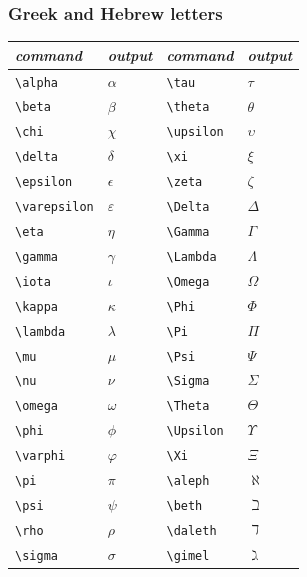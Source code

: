 \documentclass{article} %
\begin{document}
    \subsubsection{Greek and Hebrew letters}
        \begin{center}
        \begin{tabular}{l|l|l|l}
        \emph{command} & \emph{output}&\emph{command} & \emph{output}\\ \hline
        \verb!\alpha! & $\alpha$&\verb!\tau! & $\tau$\\
        \verb!\beta! & $\beta$&\verb!\theta! & $\theta$\\
        \verb!\chi! & $\chi$&\verb!\upsilon! & $\upsilon$\\
        \verb!\delta! & $\delta$&\verb!\xi! & $\xi$\\
        \verb!\epsilon! & $\epsilon$&\verb!\zeta! & $\zeta$\\
        \verb!\varepsilon! & $\varepsilon$&\verb!\Delta! & $\Delta$\\
        \verb!\eta! & $\eta$&\verb!\Gamma! & $\Gamma$\\
        \verb!\gamma! & $\gamma$&\verb!\Lambda! & $\Lambda$\\
        \verb!\iota! & $\iota$&\verb!\Omega! & $\Omega$\\
        \verb!\kappa! & $\kappa$&\verb!\Phi! & $\Phi$\\
        \verb!\lambda! & $\lambda$&\verb!\Pi! & $\Pi$\\
        \verb!\mu! & $\mu$&\verb!\Psi! & $\Psi$\\
        \verb!\nu! & $\nu$&\verb!\Sigma! & $\Sigma$\\
        \verb!\omega! & $\omega$&\verb!\Theta! & $\Theta$\\
        \verb!\phi! & $\phi$&\verb!\Upsilon! & $\Upsilon$\\
        \verb!\varphi! & $\varphi$&\verb!\Xi! & $\Xi$\\
        \verb!\pi! & $\pi$&\verb!\aleph! & $\aleph$\\
        \verb!\psi! & $\psi$&\verb!\beth! & $\beth$\\
        \verb!\rho! & $\rho$&\verb!\daleth! & $\daleth$\\
        \verb!\sigma! & $\sigma$&\verb!\gimel! & $\gimel$
        \end{tabular}
        \end{center}
\end{document}
